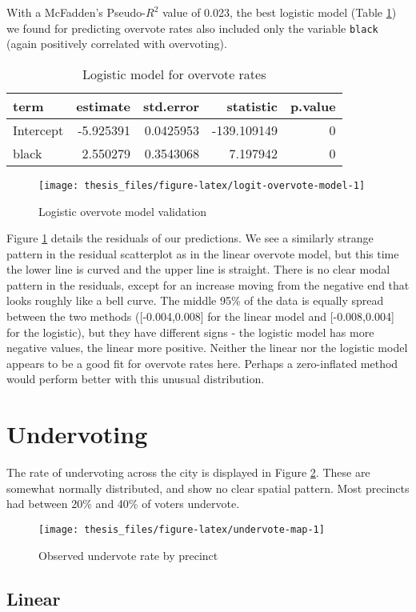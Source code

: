 \documentclass[12pt,twoside]{reedthesis}
\begin{document}
With a McFadden's Pseudo-\(R^2\) value of 0.023, the best logistic model (Table \ref{tab:logit-overvote-model}) we found for predicting overvote rates also included only the variable \texttt{black} (again positively correlated with overvoting).
\begin{table}[t]

\caption[Logit overvote model]{\label{tab:logit-overvote-model}Logistic model for overvote rates}
\centering
\begin{tabular}{lrrrr}
\toprule
term & estimate & std.error & statistic & p.value\\
\midrule
Intercept & -5.925391 & 0.0425953 & -139.109149 & 0\\
black & 2.550279 & 0.3543068 & 7.197942 & 0\\
\bottomrule
\end{tabular}
\end{table}
\begin{figure}
\texttt{[image: thesis\_files/figure-latex/logit-overvote-model-1]} \caption{Logistic overvote model validation}\label{fig:logit-overvote-model}
\end{figure}
Figure \ref{fig:logit-overvote-model} details the residuals of our predictions. We see a similarly strange pattern in the residual scatterplot as in the linear overvote model, but this time the lower line is curved and the upper line is straight. There is no clear modal pattern in the residuals, except for an increase moving from the negative end that looks roughly like a bell curve. The middle 95\% of the data is equally spread between the two methods ({[}-0.004,0.008{]} for the linear model and {[}-0.008,0.004{]} for the logistic), but they have different signs - the logistic model has more negative values, the linear more positive. Neither the linear nor the logistic model appears to be a good fit for overvote rates here. Perhaps a zero-inflated method would perform better with this unusual distribution.

\hypertarget{undervoting}{%
\section{Undervoting}\label{undervoting}}

The rate of undervoting across the city is displayed in Figure \ref{fig:undervote-map}. These are somewhat normally distributed, and show no clear spatial pattern. Most precincts had between 20\% and 40\% of voters undervote.
\begin{figure}
\texttt{[image: thesis\_files/figure-latex/undervote-map-1]} \caption{Observed undervote rate by precinct}\label{fig:undervote-map}
\end{figure}
\hypertarget{linear-2}{%
\subsection{Linear}\label{linear-2}}
\end{document}
